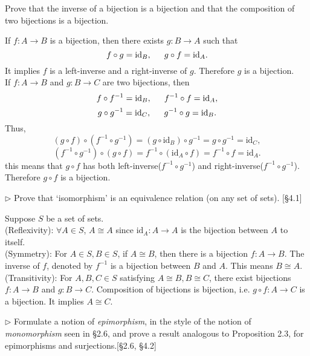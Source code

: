 \begin{problem}[2.3]
Prove that the inverse of a bijection is a bijection and that the composition
of two bijections is a bijection.
\end{problem}

\begin{solution}
If $f: A\rightarrow B$ is a bijection, then there exists $g: B\rightarrow A$ such that 
$$f\circ g = \text{id}_{B}, \indent g\circ f = \text{id}_{A}.$$
It implies $f$ is a left-inverse and a right-inverse of $g$. Therefore $g$ is a bijection.\\
If $f: A\rightarrow B$ and $g: B\rightarrow C$ are two bijections, then
$$f\circ f^{-1} = \text{id}_{B},\indent f^{-1}\circ f = \text{id}_{A},$$
$$g\circ g^{-1} = \text{id}_{C},\indent g^{-1}\circ g = \text{id}_{B}.$$
Thus,
$$(g\circ f)\circ(f^{-1}\circ g^{-1}) =(g\circ \text{id}_{B})\circ g^{-1}=g\circ g^{-1}= \text{id}_{C},$$
$$(f^{-1}\circ g^{-1})\circ(g\circ f) =f^{-1}\circ (\text{id}_{A}\circ f)=f^{-1}\circ f=\text{id}_{A}.$$
this means that $g\circ f$ has both left-inverse($f^{-1}\circ g^{-1}$) and right-inverse($f^{-1}\circ g^{-1}$). Therefore $g\circ f$ is a bijection.
\end{solution}

\begin{problem}[2.4]
 $\rhd$ Prove that ‘isomorphism’ is an equivalence relation (on any set of sets).
[\S4.1]
\end{problem}

\begin{solution}
Suppose $S$ be a set of sets.\\
(Reflexivity): $\forall A\in S$, $A\cong A$ since $\text{id}_{A}: A\rightarrow A$ is the bijection between $A$ to itself.\\
(Symmetry): For $A\in S, B\in S$, if $A\cong B$, then there is a bijection $f: A\rightarrow B$. The inverse of $f$, denoted by $f^{-1}$
is a bijection between $B$ and $A$. This means $B\cong A$.\\
(Transitivity): For $A, B, C\in S$ satisfying $A\cong B, B\cong C$, there exist bijections $f: A\rightarrow B$ and $g: B\rightarrow C$. Composition of
bijections is bijection, i.e. $g\circ f: A\rightarrow C$ is a bijection. It implies $A\cong C$.
\end{solution}

\begin{problem}[2.5]
  $\rhd$ Formulate a notion of \textit{epimorphism}, in the style
  of the notion of \textit{monomorphism} seen in \S 2.6, and prove a result
  analogous to Proposition 2.3, for epimorphisms and surjections.[\S 2.6, \S 4.2]
\end{problem}


